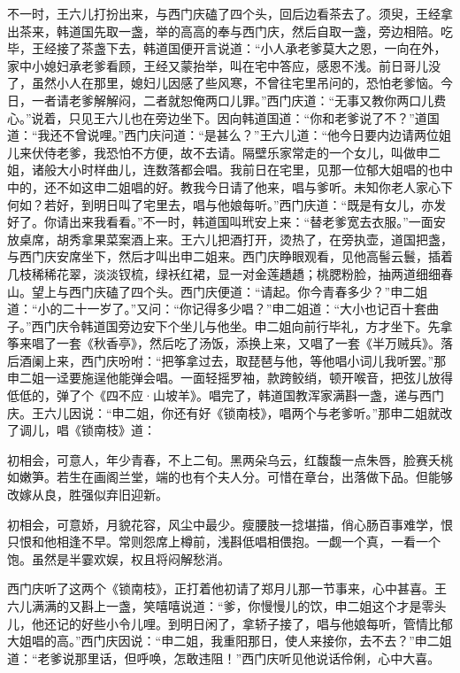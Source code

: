 不一时，王六儿打扮出来，与西门庆磕了四个头，回后边看茶去了。须臾，王经拿出茶来，韩道国先取一盏，举的高高的奉与西门庆，然后自取一盏，旁边相陪。吃毕，王经接了茶盏下去，韩道国便开言说道：“小人承老爹莫大之恩，一向在外，家中小媳妇承老爹看顾，王经又蒙抬举，叫在宅中答应，感恩不浅。前日哥儿没了，虽然小人在那里，媳妇儿因感了些风寒，不曾往宅里吊问的，恐怕老爹恼。今日，一者请老爹解解闷，二者就恕俺两口儿罪。”西门庆道：“无事又教你两口儿费心。”说着，只见王六儿也在旁边坐下。因向韩道国道：“你和老爹说了不？”道国道：“我还不曾说哩。”西门庆问道：“是甚么？”王六儿道：“他今日要内边请两位姐儿来伏侍老爹，我恐怕不方便，故不去请。隔壁乐家常走的一个女儿，叫做申二姐，诸般大小时样曲儿，连数落都会唱。我前日在宅里，见那一位郁大姐唱的也中中的，还不如这申二姐唱的好。教我今日请了他来，唱与爹听。未知你老人家心下何如？若好，到明日叫了宅里去，唱与他娘每听。”西门庆道：“既是有女儿，亦发好了。你请出来我看看。”不一时，韩道国叫玳安上来：“替老爹宽去衣服。”一面安放桌席，胡秀拿果菜案酒上来。王六儿把酒打开，烫热了，在旁执壶，道国把盏，与西门庆安席坐下，然后才叫出申二姐来。西门庆睁眼观看，见他高髻云鬟，插着几枝稀稀花翠，淡淡钗梳，绿袄红裙，显一对金莲趫趫；桃腮粉脸，抽两道细细春山。望上与西门庆磕了四个头。西门庆便道：“请起。你今青春多少？”申二姐道：“小的二十一岁了。”又问：“你记得多少唱？”申二姐道：“大小也记百十套曲子。”西门庆令韩道国旁边安下个坐儿与他坐。申二姐向前行毕礼，方才坐下。先拿筝来唱了一套《秋香亭》，然后吃了汤饭，添换上来，又唱了一套《半万贼兵》。落后酒阑上来，西门庆吩咐：“把筝拿过去，取琵琶与他，等他唱小词儿我听罢。”那申二姐一迳要施逞他能弹会唱。一面轻摇罗袖，款跨鲛绡，顿开喉音，把弦儿放得低低的，弹了个《四不应·山坡羊》。唱完了，韩道国教浑家满斟一盏，递与西门庆。王六儿因说：“申二姐，你还有好《锁南枝》，唱两个与老爹听。”那申二姐就改了调儿，唱《锁南枝》道：

初相会，可意人，年少青春，不上二旬。黑两朵乌云，红馥馥一点朱唇，脸赛夭桃如嫩笋。若生在画阁兰堂，端的也有个夫人分。可惜在章台，出落做下品。但能够改嫁从良，胜强似弃旧迎新。

初相会，可意娇，月貌花容，风尘中最少。瘦腰肢一捻堪描，俏心肠百事难学，恨只恨和他相逢不早。常则怨席上樽前，浅斟低唱相偎抱。一觑一个真，一看一个饱。虽然是半霎欢娱，权且将闷解愁消。

西门庆听了这两个《锁南枝》，正打着他初请了郑月儿那一节事来，心中甚喜。王六儿满满的又斟上一盏，笑嘻嘻说道：“爹，你慢慢儿的饮，申二姐这个才是零头儿，他还记的好些小令儿哩。到明日闲了，拿轿子接了，唱与他娘每听，管情比郁大姐唱的高。”西门庆因说：“申二姐，我重阳那日，使人来接你，去不去？”申二姐道：“老爹说那里话，但呼唤，怎敢违阻！”西门庆听见他说话伶俐，心中大喜。

